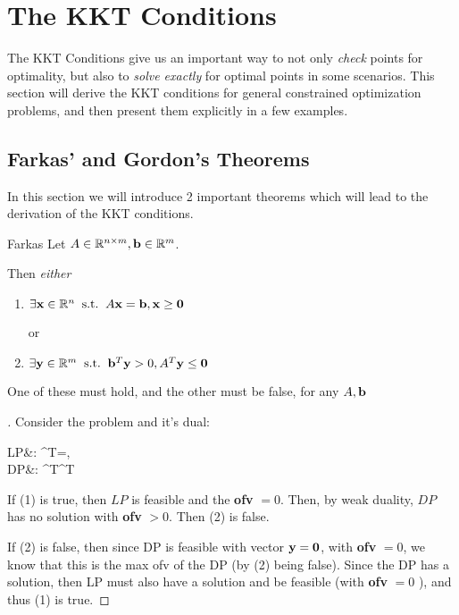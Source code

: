 \pagebreak
\section{The KKT Conditions}

The KKT Conditions give us an important way to not only \textit{check} points for 
optimality, but also to \textit{solve exactly} for optimal points in some scenarios. 
This section
will derive the KKT conditions for general constrained optimization problems,
and then present them explicitly in a few examples.

\subsection{Farkas' and Gordon's Theorems}

In this section we will introduce 2 important theorems which will lead to the
derivation of the KKT conditions.

\begin{theo}{Farkas}{}
Let $A \in \mathbb{R}^{n \times m}, \mathbf{b} \in \mathbb{R}^m$.

\medskip
Then \textit{either} 
\begin{enumerate}[(1)]
	\item $\exists \mathbf{x} \in \mathbb{R}^n \;\; \text{s.t.} \;\; A\mathbf{x} = \mathbf{b}, \mathbf{x} \geq \mathbf{0}$ 

		or
	\item $\exists \mathbf{y} \in \mathbb{R}^m \;\; \text{s.t.} \;\; \mathbf{b}^T\mathbf{y} > 0, A^T\mathbf{y} \leq \mathbf{0}$
\end{enumerate}

One of these must hold, and the other must be false, for any $A, \mathbf{b}$
\end{theo}

\begin{proof}[]
Consider the problem and it's dual:
\begin{frml}
	LP&: \min \vzero^T\vx \st \vA\vx=\vb, \vx\geq\vzero  \\
	DP&: \max \vb^T\vy \st \vA^T\vy \leq \vzero
\end{frml}

If (1) is true, then $LP$ is feasible and the \textbf{ofv} $= 0$. Then, by weak duality,
$DP$ has no solution with \textbf{ofv} $> 0$. Then (2) is false.

If (2) is false, then since DP is feasible with vector $\mathbf{y} = \mathbf{0}$, with
\textbf{ofv} $ = 0$, we know that this is the max ofv of the DP (by 
(2) being false).
Since the DP has a solution, then LP must also have a solution and be feasible
(with \textbf{ofv} $= 0$ ),
and thus (1) is true.

\end{proof}

